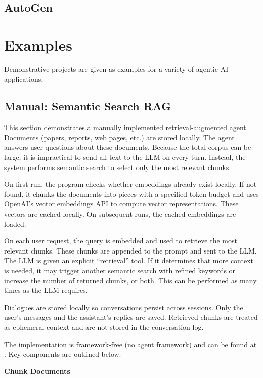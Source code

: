 \subsection{AutoGen}

\section{Examples}

Demonstrative projects are given as examples for a variety of agentic AI applications. 

\subsection{Manual: Semantic Search RAG}

This section demonstrates a manually implemented retrieval‑augmented agent. Documents (papers, reports, web pages, etc.) are stored locally. The agent answers user questions about these documents. Because the total corpus can be large, it is impractical to send all text to the LLM on every turn. Instead, the system performs semantic search to select only the most relevant chunks.

On first run, the program checks whether embeddings already exist locally. If not found, it chunks the documents into pieces with a specified token budget and uses OpenAI’s vector embeddings API to compute vector representations. These vectors are cached locally. On subsequent runs, the cached embeddings are loaded.

On each user request, the query is embedded and used to retrieve the most relevant chunks. These chunks are appended to the prompt and sent to the LLM. The LLM is given an explicit ``retrieval'' tool. If it determines that more context is needed, it may trigger another semantic search with refined keywords or increase the number of returned chunks, or both. This can be performed as many times as the LLM requires.

Dialogues are stored locally so conversations persist across sessions. Only the user’s messages and the assistant’s replies are saved. Retrieved chunks are treated as ephemeral context and are not stored in the conversation log.

The implementation is framework‑free (no agent framework) and can be found at \cite{sun2025document}. Key components are outlined below.

\vspace{0.1in}
\noindent \textbf{Chunk Documents}
\vspace{0.1in}

